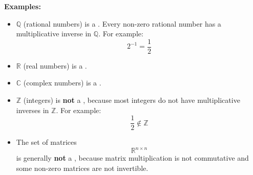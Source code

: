 \textbf{Examples:}
\begin{itemize}
    \item $\mathbb{Q}$ (rational numbers) is a .
    Every non-zero rational number has a multiplicative inverse in $\mathbb{Q}$.
    For example:
    \[
    2^{-1} = \frac{1}{2}
    \]

    \item $\mathbb{R}$ (real numbers) is a .

    \item $\mathbb{C}$ (complex numbers) is a .

    \item $\mathbb{Z}$ (integers) is \textbf{not} a ,
    because most integers do not have multiplicative inverses in $\mathbb{Z}$.
    For example:
    \[
    \frac{1}{2} \notin \mathbb{Z}
    \]

    \item The set of matrices
    \[
    \mathbb{R}^{n \times n}
    \]
    is generally \textbf{not} a ,
    because matrix multiplication is not commutative and some non-zero
    matrices are not invertible.
\end{itemize}
